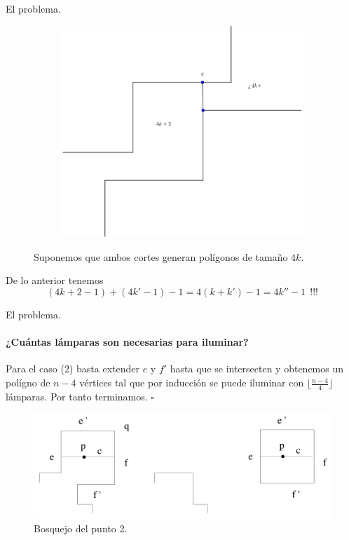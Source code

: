 \begin{frame}{El problema.}
\begin{figure}
\begin{subfigure}[b]{0.25\paperwidth}
    \end{subfigure}
    \begin{subfigure}[b]{0.25\paperwidth}
      \includegraphics[width=.3 \paperwidth]{./images/EjemplarC2(4k + 2).png}
    \end{subfigure}
    \caption*{Suponemos que ambos cortes generan polígonos de tamaño $4k$.}
  \end{figure}
  De lo anterior tenemos
  \[(4k + 2 - 1) + (4k' - 1) - 1 = 4(k + k') - 1 = 4k'' - 1 \:\: !!!\]
  \newline
  
\end{frame}

\begin{frame}{El problema.} %
  \framesubtitle{¿Cuántas lámparas son necesarias para iluminar?} %
  Para el caso (2) basta extender $e$ y $f'$ hasta que se intersecten y obtenemos un polígno de $n - 4$ vértices
  tal que por inducción se puede iluminar con $\lfloor \frac{n - 4}{4} \rfloor$ lámparas. Por tanto terminamos. \hfill $\square$
  \begin{figure}
    \centering
    \includegraphics[width=.8 \paperwidth]{./images/Caso2.png}
    \caption*{Bosquejo del punto 2.}
  \end{figure}
\end{frame}

